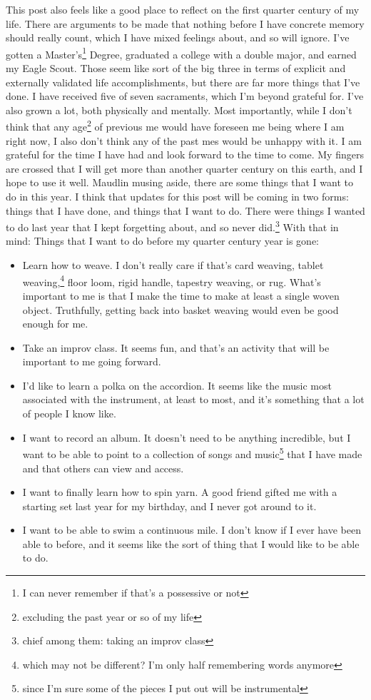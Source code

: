 \documentclass[12pt]{article}[titlepage]
\newcommand{\1}{\={a}}
\newcommand{\2}{\={e}}
\newcommand{\3}{\={\i}}
\newcommand{\4}{\=o}
\newcommand{\5}{\=u}
\newcommand{\6}{\={A}}
\renewcommand{\,}{\textsuperscript{,}}
\begin{document}
This post also feels like a good place to reflect on the first quarter century of my life.
There are arguments to be made that nothing before I have concrete memory should really count, which I have mixed feelings about, and so will ignore.
I've gotten a Master's\footnote{I can never remember if that's a possessive or not} Degree, graduated a college with a double major, and earned my Eagle Scout.
Those seem like sort of the big three in terms of explicit and externally validated life accomplishments, but there are far more things that I've done.
I have received five of seven sacraments, which I'm beyond grateful for.
I've also grown a lot, both physically and mentally.
Most importantly, while I don't think that any age\footnote{excluding the past year or so of my life} of previous me would have foreseen me being where I am right now, I also don't think any of the past mes would be unhappy with it.
I am grateful for the time I have had and look forward to the time to come.
My fingers are crossed that I will get more than another quarter century on this earth, and I hope to use it well.
Maudlin musing aside, there are some things that I want to do in this year.
I think that updates for this post will be coming in two forms: things that I have done, and things that I want to do.
There were things I wanted to do last year that I kept forgetting about, and so never did.\footnote{chief among them: taking an improv class}
With that in mind:
Things that I want to do before my quarter century year is gone:
\begin{itemize}
\item Learn how to weave.
I don't really care if that's card weaving, tablet weaving,\footnote{which may not be different? I'm only half remembering words anymore} floor loom, rigid handle, tapestry weaving, or rug.
What's important to me is that I make the time to make at least a single woven object.
Truthfully, getting back into basket weaving would even be good enough for me.
\item Take an improv class.
It seems fun, and that's an activity that will be important to me going forward.
\item I'd like to learn a polka on the accordion.
It seems like the music most associated with the instrument, at least to most, and it's something that a lot of people I know like.
\item I want to record an album.
It doesn't need to be anything incredible, but I want to be able to point to a collection of songs and music\footnote{since I'm sure some of the pieces I put out will be instrumental} that I have made and that others can view and access.
\item I want to finally learn how to spin yarn.
A good friend gifted me with a starting set last year for my birthday, and I never got around to it.
\item I want to be able to swim a continuous mile.
I don't know if I ever have been able to before, and it seems like the sort of thing that I would like to be able to do.
\end{itemize}
\end{document}
